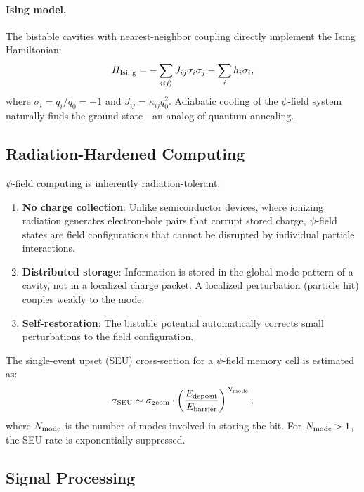 \documentclass[12pt,a4paper,twoside]{article}
\begin{document}
\paragraph{Ising model.} The bistable cavities with nearest-neighbor coupling directly implement the Ising Hamiltonian:
\begin{equation}
H_{\rm Ising} = -\sum_{\langle ij \rangle} J_{ij} \sigma_i \sigma_j - \sum_i h_i \sigma_i,
\end{equation}
where $\sigma_i = q_i/q_0 = \pm 1$ and $J_{ij} = \kappa_{ij} q_0^2$. Adiabatic cooling of the $\psi$-field system naturally finds the ground state---an analog of quantum annealing.

\subsection{Radiation-Hardened Computing}\label{sec:rad_hard}

$\psi$-field computing is inherently radiation-tolerant:
\begin{enumerate}
\item \textbf{No charge collection}: Unlike semiconductor devices, where ionizing radiation generates electron-hole pairs that corrupt stored charge, $\psi$-field states are field configurations that cannot be disrupted by individual particle interactions.
\item \textbf{Distributed storage}: Information is stored in the global mode pattern of a cavity, not in a localized charge packet. A localized perturbation (particle hit) couples weakly to the mode.
\item \textbf{Self-restoration}: The bistable potential automatically corrects small perturbations to the field configuration.
\end{enumerate}

The single-event upset (SEU) cross-section for a $\psi$-field memory cell is estimated as:
\begin{equation}
\sigma_{\rm SEU} \sim \sigma_{\rm geom} \cdot \left(\frac{E_{\rm deposit}}{E_{\rm barrier}}\right)^{N_{\rm mode}},
\end{equation}
where $N_{\rm mode}$ is the number of modes involved in storing the bit. For $N_{\rm mode} > 1$, the SEU rate is exponentially suppressed.

\subsection{Signal Processing}\label{sec:signal}
\end{document}
